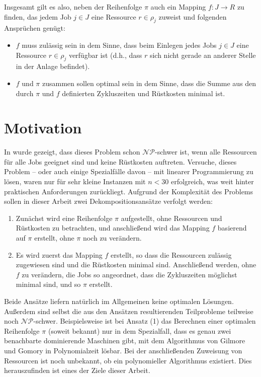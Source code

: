\documentclass{scrreprt}
\begin{document}
Insgesamt gilt es also, neben der Reihenfolge $\pi$ auch ein Mapping $f:J\rightarrow R$ zu finden, 
das jedem Job $j\in J$ eine Ressource $r\in\rho_j$ zuweist und folgenden Ansprüchen genügt:
\begin{itemize}
    \item $f$ muss zulässig sein in dem Sinne, dass beim Einlegen jedes Jobs $j\in J$ eine Ressource $r\in\rho_j$ verfügbar ist
        (d.h., dass $r$ sich nicht gerade an anderer Stelle in der Anlage befindet).
    \item $f$ und $\pi$ zusammen sollen optimal sein in dem Sinne, dass die Summe aus den durch $\pi$ und $f$ definierten Zykluszeiten und 
        Rüstkosten minimal ist.
\end{itemize}

\section{Motivation}
In \cite{...} wurde gezeigt, dass dieses Problem schon $\mathcal{NP}$-schwer ist, wenn alle Ressourcen für alle Jobs geeignet sind
und keine Rüstkosten auftreten.
Versuche, dieses Problem -- oder auch einige Spezialfälle davon -- mit linearer Programmierung zu lösen, waren nur für sehr kleine Instanzen mit
$n<30$ erfolgreich, was weit hinter praktischen Anforderungen zurückliegt. Aufgrund der Komplexität des Problems sollen in dieser Arbeit
zwei Dekompositionsansätze verfolgt werden:
\begin{enumerate}
    \item Zunächst wird eine Reihenfolge $\pi$ aufgestellt, ohne Ressourcen und Rüstkosten zu betrachten, 
        und anschließend wird das Mapping $f$ basierend auf $\pi$ erstellt, ohne $\pi$ noch zu verändern.
    \item Es wird zuerst das Mapping $f$ erstellt, so dass die Ressourcen zulässig zugewiesen sind und die Rüstkosten minimal sind.
        Anschließend werden, ohne $f$ zu verändern, die Jobs so angeordnet, dass die Zykluszeiten möglichst minimal sind, und so $\pi$ erstellt.
\end{enumerate}%
Beide Ansätze liefern natürlich im Allgemeinen keine optimalen Lösungen. 
Außerdem sind selbst die aus den Ansätzen resultierenden Teilprobleme teilweise noch $\mathcal{NP}$-schwer.
Beispielsweise ist bei Ansatz (1) das Berechnen einer optimalen Reihenfolge $\pi$ (soweit bekannt) nur in dem Spezialfall,
dass es genau zwei benachbarte dominierende Maschinen gibt,
mit dem Algorithmus von Gilmore und Gomory \cite{...} in Polynomialzeit lösbar.
Bei der anschließenden Zuweisung von Ressourcen ist noch unbekannt, ob ein polynomieller Algorithmus existiert.
Dies herauszufinden ist eines der Ziele dieser Arbeit.
\end{document}

